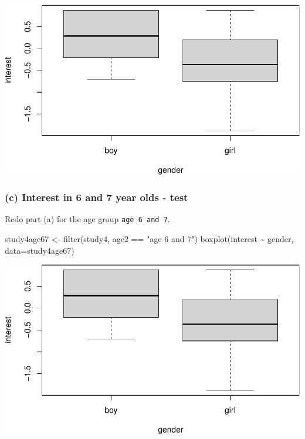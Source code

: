 \documentclass[
]{book}
\newenvironment{Shaded}{\begin{snugshade}}{\end{snugshade}}
\newcommand{\AttributeTok}[1]{\textcolor[rgb]{0.77,0.63,0.00}{#1}}
\newcommand{\FunctionTok}[1]{\textcolor[rgb]{0.00,0.00,0.00}{#1}}
\newcommand{\NormalTok}[1]{#1}
\newcommand{\OtherTok}[1]{\textcolor[rgb]{0.56,0.35,0.01}{#1}}
\newcommand{\SpecialCharTok}[1]{\textcolor[rgb]{0.00,0.00,0.00}{#1}}
\newcommand{\StringTok}[1]{\textcolor[rgb]{0.31,0.60,0.02}{#1}}
\begin{document}
\includegraphics[width=1\linewidth]{Class_Activity_14_files/figure-latex/unnamed-chunk-6-1}

\vspace*{1in}

\hypertarget{c-interest-in-6-and-7-year-olds---test}{%
\subsubsection{(c) Interest in 6 and 7 year olds - test}\label{c-interest-in-6-and-7-year-olds---test}}

Redo part (a) for the age group \texttt{age\ 6\ and\ 7}.

\begin{Shaded}
\begin{Highlighting}[]
\NormalTok{study4age67 }\OtherTok{\textless{}{-}} \FunctionTok{filter}\NormalTok{(study4, age2 }\SpecialCharTok{==} \StringTok{"age 6 and 7"}\NormalTok{)}
\FunctionTok{boxplot}\NormalTok{(interest }\SpecialCharTok{\textasciitilde{}}\NormalTok{ gender, }\AttributeTok{data=}\NormalTok{study4age67)}
\end{Highlighting}
\end{Shaded}

\includegraphics[width=1\linewidth]{Class_Activity_14_files/figure-latex/unnamed-chunk-7-1}
\end{document}
